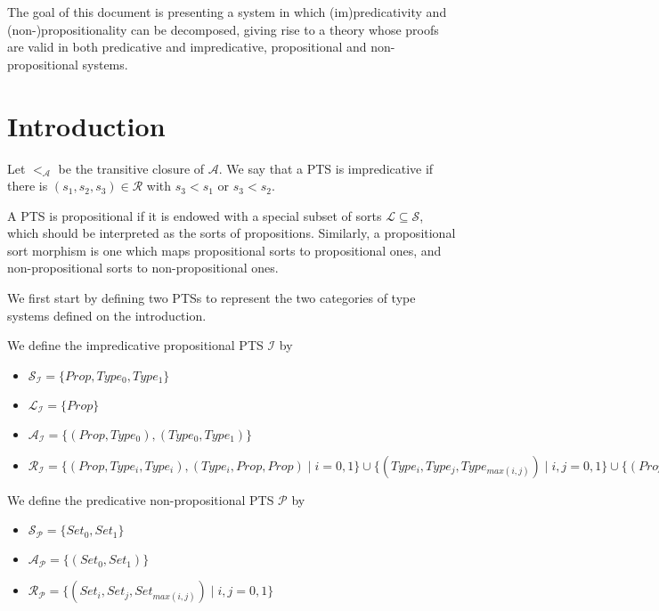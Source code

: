 \documentclass[]{template}
\begin{document}
The goal of this document is presenting a system in which (im)predicativity and (non-)propositionality can be decomposed, giving rise to a theory whose proofs are valid in both predicative and impredicative, propositional and non-propositional systems. 

\section{Introduction}
\label{sec:label}



\begin{definition}[Impredicativity]
Let $ <_\mathcal{A} $ be the transitive closure of $ \mathcal{A} $. We say that a PTS is impredicative if there is $ (s_1,s_2,s_3) \in \mathcal{R} $ with $ s_3 < s_1 $ or $ s_3 < s_2 $.
\end{definition}

\begin{definition}[Propositionality]
A PTS is propositional if it is endowed with a special subset of sorts $ \mathcal{L} \subseteq \mathcal{S} $, which should be interpreted as the sorts of propositions. Similarly, a propositional sort morphism is one which maps propositional sorts to propositional ones, and non-propositional sorts to non-propositional ones.
\end{definition}

We first start by defining two PTSs to represent the two categories of type systems defined on the introduction.

\begin{definition}
  We define the impredicative propositional PTS $ \mathcal{I}$ by
  \begin{itemize}
  \item $ \mathcal{S}_\mathcal{I} = \{Prop, Type_0, Type_1\} $
  \item $ \mathcal{L}_\mathcal{I} = \{Prop\} $
  \item $ \mathcal{A}_\mathcal{I} = \{(Prop, Type_0), (Type_0,Type_1)\} $
  \item $ \mathcal{R}_\mathcal{I} = \{(Prop, Type_i, Type_i), (Type_i, Prop, Prop) \mid i =0,1\} \cup \{(Type_i, Type_j, Type_{max(i,j)}) \mid i,j = 0, 1\} \cup \{(Prop,Prop,Prop)\}$   
  \end{itemize}
\end{definition}

\begin{definition}
  We define the predicative non-propositional PTS $ \mathcal{P}$ by
  \begin{itemize}
  \item $ \mathcal{S}_\mathcal{P} = \{Set_0, Set_1\} $
  \item $ \mathcal{A}_\mathcal{P} = \{(Set_0, Set_1)\} $
  \item $ \mathcal{R}_\mathcal{P} = \{(Set_i, Set_j, Set_{max(i,j)}) \mid i,j = 0, 1\}$    
  \end{itemize}
\end{definition}
\end{document}
